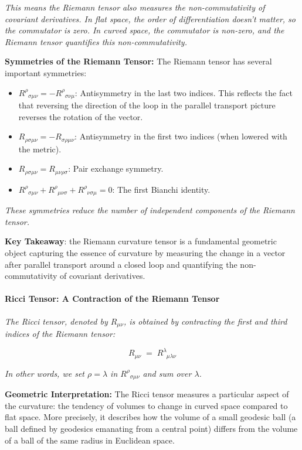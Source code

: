 \documentclass{article}
\begin{document}
\textit{This means the Riemann tensor also measures the non-commutativity of covariant derivatives. In flat space, the order of differentiation doesn't matter, so the commutator is zero. In curved space, the commutator is non-zero, and the Riemann tensor quantifies this non-commutativity.}

\textbf{Symmetries of the Riemann Tensor:} The Riemann tensor has several important symmetries:
\begin{itemize}
    \item \(R^\rho_{\;\;\sigma\mu\nu} = -R^\rho_{\;\;\sigma\nu\mu}\): Antisymmetry in the last two indices. This reflects the fact that reversing the direction of the loop in the parallel transport picture reverses the rotation of the vector.
    \item \(R_{\rho\sigma\mu\nu} = -R_{\sigma\rho\mu\nu}\): Antisymmetry in the first two indices (when lowered with the metric).
    \item \(R_{\rho\sigma\mu\nu} = R_{\mu\nu\rho\sigma}\): Pair exchange symmetry.
    \item \(R^\rho_{\;\;\sigma\mu\nu} + R^\rho_{\;\;\mu\nu\sigma} + R^\rho_{\;\;\nu\sigma\mu} = 0\): The first Bianchi identity.
\end{itemize}

\textit{These symmetries reduce the number of independent components of the Riemann tensor.}

\textbf{Key Takeaway}: the Riemann curvature tensor is a fundamental geometric object capturing the essence of curvature by measuring the change in a vector after parallel transport around a closed loop and quantifying the non-commutativity of covariant derivatives.

\paragraph{Ricci Tensor: A Contraction of the Riemann Tensor}

\textit{The Ricci tensor, denoted by \(R_{\mu\nu}\), is obtained by contracting the first and third indices of the Riemann tensor:}

\[
R_{\mu\nu} \;=\; R^\lambda_{\;\;\mu\lambda\nu}
\]

\textit{In other words, we set \(\rho = \lambda\) in \(R^\rho_{\;\;\sigma\mu\nu}\) and sum over \(\lambda\).}

\textbf{Geometric Interpretation:} The Ricci tensor measures a particular aspect of the curvature: the tendency of volumes to change in curved space compared to flat space. More precisely, it describes how the volume of a small geodesic ball (a ball defined by geodesics emanating from a central point) differs from the volume of a ball of the same radius in Euclidean space.
\end{document}
